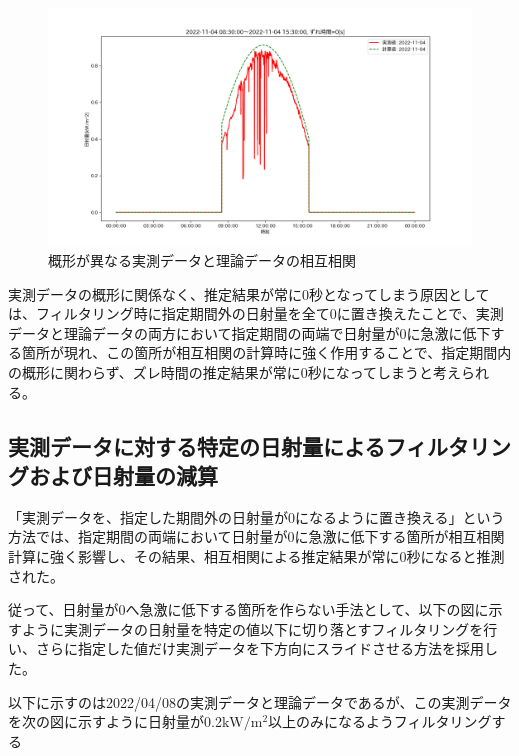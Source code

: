 \documentclass[a4j,12pt,]{jarticle}
\begin{document}
\begin{figure}[H]
  \begin{center}
    \includegraphics[width=160mm]{7.png}
    \caption{概形が異なる実測データと理論データの相互相関}
    \label{p7}
  \end{center}
\end{figure}

実測データの概形に関係なく、推定結果が常に0秒となってしまう原因としては、フィルタリング時に指定期間外の日射量を全て0に置き換えたことで、実測データと理論データの両方において指定期間の両端で日射量が0に急激に低下する箇所が現れ、この箇所が相互相関の計算時に強く作用することで、指定期間内の概形に関わらず、ズレ時間の推定結果が常に0秒になってしまうと考えられる。

\subsection{実測データに対する特定の日射量によるフィルタリングおよび日射量の減算}
「実測データを、指定した期間外の日射量が0になるように置き換える」という方法では、指定期間の両端において日射量が0に急激に低下する箇所が相互相関計算に強く影響し、その結果、相互相関による推定結果が常に0秒になると推測された。

従って、日射量が0へ急激に低下する箇所を作らない手法として、以下の図に示すように実測データの日射量を特定の値以下に切り落とすフィルタリングを行い、さらに指定した値だけ実測データを下方向にスライドさせる方法を採用した。

以下に示すのは2022/04/08の実測データと理論データであるが、この実測データを次の図に示すように日射量が0.2$\mathrm{kW}/\mathrm{m}^2$以上のみになるようフィルタリングする
\end{document}

